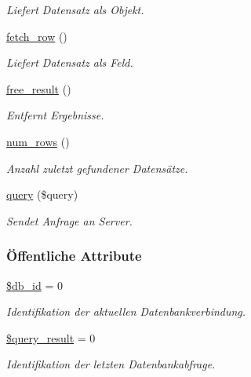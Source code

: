 \begin{CompactItemize}
\begin{CompactList}\small\item\em Liefert Datensatz als Objekt. \item\end{CompactList}\item 
\hyperlink{classSQLDB_cbd6f7a7ad0dbe4cd7f0533649be1abd}{fetch\_\-row} ()
\begin{CompactList}\small\item\em Liefert Datensatz als Feld. \item\end{CompactList}\item 
\hyperlink{classSQLDB_8168b4df39a17186620e4777c7413a44}{free\_\-result} ()
\begin{CompactList}\small\item\em Entfernt Ergebnisse. \item\end{CompactList}\item 
\hyperlink{classSQLDB_8b8f1f63b6172381e118b3cbc32f9f69}{num\_\-rows} ()
\begin{CompactList}\small\item\em Anzahl zuletzt gefundener Datensätze. \item\end{CompactList}\item 
\hyperlink{classSQLDB_9a5af86138a3bb12ba443318a26103a1}{query} (\$query)
\begin{CompactList}\small\item\em Sendet Anfrage an Server. \item\end{CompactList}\end{CompactItemize}
\subsubsection*{\"{O}ffentliche Attribute}
\begin{CompactItemize}
\item 
\hyperlink{classSQLDB_2c62843044a6ec53ad3384fb36aa811b}{\$db\_\-id} = 0
\begin{CompactList}\small\item\em Identifikation der aktuellen Datenbankverbindung. \item\end{CompactList}\item 
\hyperlink{classSQLDB_879fa41a3df6664f4ce83960808326ab}{\$query\_\-result} = 0
\begin{CompactList}\small\item\em Identifikation der letzten Datenbankabfrage. \item\end{CompactList}\end{CompactItemize}


